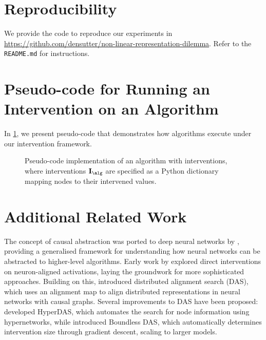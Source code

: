 \newpage

\section{Reproducibility}\label{app:reproducability}

We provide the code to reproduce our experiments in \url{https://github.com/densutter/non-linear-representation-dilemma}.
Refer to the \texttt{README.md} for instructions.

\section{Pseudo-code for Running an Intervention on an Algorithm}
\label{sec:pseudo_code_intervention}

In \cref{alg:alg_with_interventions}, we present pseudo-code that demonstrates how algorithms execute under our intervention framework.

\begin{figure}[h]
    \centering
    
    \caption{Pseudo-code implementation of an algorithm with interventions, where interventions $\interventionsalg$ are specified as a Python dictionary mapping nodes to their intervened values.}
    \label{alg:alg_with_interventions}
\end{figure}

\section{Additional Related Work}\label{appsec:Additional_Related_Work}

The concept of causal abstraction was ported to deep neural networks by \citet{Geiger2023CausalAA}, providing a generalised framework for understanding how neural networks can be abstracted to higher-level algorithms.
Early work by \citet{Geiger2021CausalAO} explored direct interventions on neuron-aligned activations, laying the groundwork for more sophisticated approaches. 
Building on this, \citet{Geiger2023FindingAB} introduced distributed alignment search (DAS), which uses an alignment map to align distributed representations in neural networks with causal graphs. Several improvements to DAS have been proposed: \citet{Sun2025HyperDASTA} developed HyperDAS, which automates the search for node information using hypernetworks, while \citet{wu2023interpretability} introduced Boundless DAS, which automatically determines intervention size through gradient descent, scaling to larger models.

